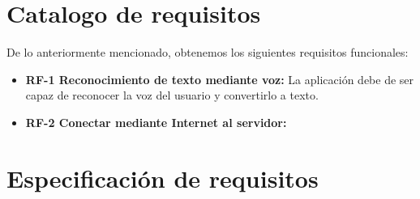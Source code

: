 \section{Catalogo de requisitos}

De lo anteriormente mencionado, obtenemos los siguientes requisitos funcionales:

\begin{itemize}
	\tightlist
	\item
	\textbf{RF-1 Reconocimiento de texto mediante voz: } La aplicación debe de ser capaz de reconocer la voz del usuario y convertirlo a texto.
	\item 
	\textbf{RF-2 Conectar mediante Internet al servidor: } 
\end{itemize}


\section{Especificación de requisitos}


